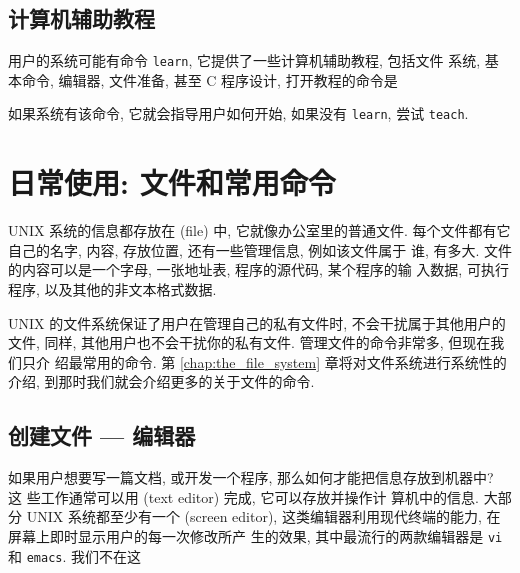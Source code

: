 \subsection{计算机辅助教程}
\label{subsec:computer_aided_instruction}

用户的系统可能有命令 \texttt{learn}, 它提供了一些计算机辅助教程, 包括文件
系统, 基本命令, 编辑器, 文件准备, 甚至 C 程序设计, 打开教程的命令是
如果系统有该命令, 它就会指导用户如何开始, 如果没有 \texttt{learn}, 尝试
\texttt{teach}.

\section{日常使用: 文件和常用命令}
\label{sec:day_to_day_use_files_and_common_commands}

UNIX 系统的信息都存放在  (file) 中, 它就像办公室里的普通文件.
每个文件都有它自己的名字, 内容, 存放位置, 还有一些管理信息, 例如该文件属于
谁, 有多大. 文件的内容可以是一个字母, 一张地址表, 程序的源代码, 某个程序的输
入数据, 可执行程序, 以及其他的非文本格式数据.

UNIX 的文件系统保证了用户在管理自己的私有文件时, 不会干扰属于其他用户的文件,
同样, 其他用户也不会干扰你的私有文件. 管理文件的命令非常多, 但现在我们只介
绍最常用的命令. 第 \ref{chap:the_file_system} 章将对文件系统进行系统性的介绍,
到那时我们就会介绍更多的关于文件的命令.

\subsection{创建文件 --- 编辑器}
\label{subsec:creating_files_the_editor}

如果用户想要写一篇文档, 或开发一个程序, 那么如何才能把信息存放到机器中? 这
些工作通常可以用  (text editor) 完成, 它可以存放并操作计
算机中的信息. 大部分 UNIX 系统都至少有一个  (screen
editor), 这类编辑器利用现代终端的能力, 在屏幕上即时显示用户的每一次修改所产
生的效果, 其中最流行的两款编辑器是 \texttt{vi} 和 \texttt{emacs}. 我们不在这
